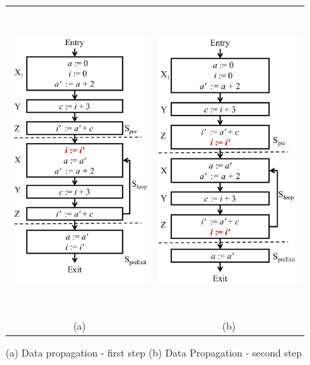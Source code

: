 \begin{figure}[t!]
\begin{center}
\begin{tabular}{cc}
\includegraphics[height=4.5in]{fig-proposal/algorithm-after-data-propagation-1}
&
\includegraphics[height=4.5in]{fig-proposal/algorithm-after-data-propagation-2}
\\
(a) & (b)
\\
\end{tabular}
\end{center}
\caption{(a) Data propagation - first step (b) Data Propagation - second step}
\label{fig:algo2-2}
\end{figure}


